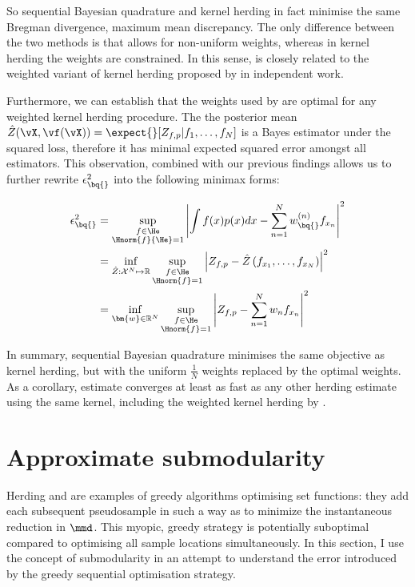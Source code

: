 So sequential Bayesian quadrature and kernel herding in fact minimise the same Bregman divergence, maximum mean discrepancy. The only difference between the two methods is that \sbq{} allows for non-uniform weights, whereas in kernel herding the weights are constrained. In this sense, \sbq{} is closely related to the weighted variant of kernel herding proposed by \citet{Bach2012} in independent work.

Furthermore, we can establish that the weights used by \sbq{} are optimal for any weighted kernel herding procedure. The the posterior mean $\hat{Z}(\vX,\vf(\vX)) = \expect{}[{Z_{f,p}\vert f_1,\ldots,f_N}]$ is a Bayes estimator under the squared loss, therefore it has minimal expected squared error amongst all estimators. This observation, combined with our previous findings allows us to further rewrite $\epsilon^{2}_{\bq{}}$ into the following minimax forms:

\begin{align}
\epsilon^{2}_{\bq{}} &= \sup_{\substack{f\in\He\\\Hnorm{f}{\He}=1}} \left| \int f(x) p(x) dx - \sum_{n=1}^{N}w^{(n)}_{\bq{}} f_{x_n}\right|^2\\
	&= \inf_{\hat{Z}:\mathcal{X}^N\mapsto\mathbb{R}} \sup_{\substack{f\in\He\\\Hnorm{f}=1}} \left| Z_{f,p} - \hat{Z}\left(f_{x_1},\ldots,f_{x_N}\right)\right|^2\\
	&= \inf_{\bm{w}\in\mathbb{R}^N} \sup_{\substack{f\in\He\\\Hnorm{f}=1}} \left| Z_{f,p} - \sum_{n=1}^{N}w_n  f_{x_n}\right|^2
\end{align}

In summary, sequential Bayesian quadrature minimises the same objective as kernel herding, but with the uniform $\frac{1}{N}$ weights replaced by the optimal weights. As a corollary, \sbq{} estimate converges at least as fast as any other herding estimate using the same kernel, including the weighted kernel herding by \citet{Bach2012}.

\section{Approximate submodularity}

Herding and \sbq{} are examples of greedy algorithms optimising set functions: they add each subsequent pseudosample in such a way as to minimize the instantaneous reduction in $\mmd$. This myopic, greedy strategy is potentially suboptimal compared to optimising all sample locations simultaneously. In this section, I use the concept of submodularity \citep[see \eg][]{KrauseCevher10} in an attempt to understand the error introduced by the greedy sequential optimisation strategy.

